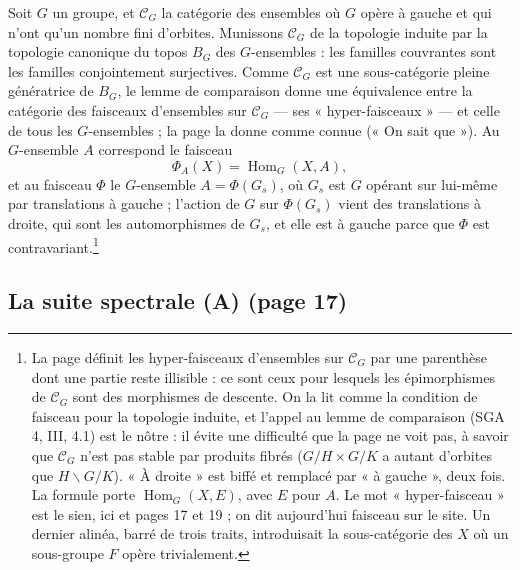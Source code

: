 \documentclass[11pt,a4paper]{article}
\begin{document}
Soit $G$ un groupe, et $\mathcal{C}_G$ la catégorie des ensembles où $G$
opère à gauche et qui n'ont qu'un nombre fini d'orbites. Munissons
$\mathcal{C}_G$ de la topologie induite par la topologie canonique du topos
$B_G$ des $G$-ensembles : les familles couvrantes sont les familles
conjointement surjectives. Comme $\mathcal{C}_G$ est une sous-catégorie
pleine génératrice de $B_G$, le lemme de comparaison donne une équivalence
entre la catégorie des faisceaux d'ensembles sur $\mathcal{C}_G$ --- ses
« hyper-faisceaux » --- et celle de tous les $G$-ensembles ; la page
la donne comme connue (« On sait que »). Au
$G$-ensemble $A$ correspond le faisceau
\[
  \Phi_A(X) = \operatorname{Hom}_G(X, A),
\]
et au faisceau $\Phi$ le $G$-ensemble $A = \Phi(G_s)$, où $G_s$ est $G$
opérant sur lui-même par translations à gauche ; l'action de $G$ sur
$\Phi(G_s)$ vient des translations à droite, qui sont les automorphismes de
$G_s$, et elle est à gauche parce que $\Phi$ est
contravariant.\footnote{La page définit les hyper-faisceaux d'ensembles
sur $\mathcal{C}_G$ par une parenthèse dont une partie reste illisible :
ce sont ceux pour lesquels les épimorphismes de $\mathcal{C}_G$
sont des morphismes de descente. On la lit comme la condition de faisceau
pour la topologie induite, et l'appel au lemme de comparaison (SGA 4, III,
4.1) est le nôtre : il évite une difficulté que la page ne voit pas, à
savoir que $\mathcal{C}_G$ n'est pas stable par produits fibrés
($G/H \times G/K$ a autant d'orbites que $H \backslash G / K$). « À droite »
est biffé et remplacé par « à gauche », deux fois. La formule porte
$\operatorname{Hom}_G(X, E)$, avec $E$ pour $A$. Le mot « hyper-faisceau »
est le sien, ici et pages 17 et 19 ; on dit aujourd'hui faisceau sur le
site. Un dernier alinéa,
barré de trois traits, introduisait la sous-catégorie des $X$ où un
sous-groupe $F$ opère trivialement.}

\subsection*{La suite spectrale (A) (page 17)}
\end{document}
